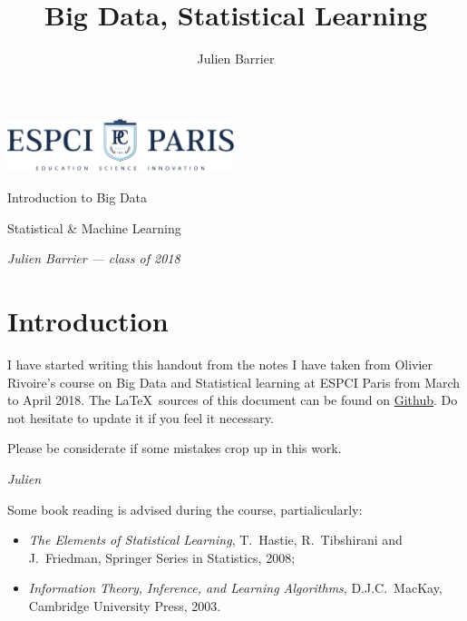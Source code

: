 \documentclass[a4paper]{tufte-book}
\title{Big Data, Statistical Learning}
\author{Julien Barrier}
\newcommand{\thetitle}{Introduction to Big Data}
\newcommand{\theauthor}{Julien Barrier --- class of 2018}
\newcommand{\pc}{ESPCI Paris}
\newcommand{\thesubtitle}{Statistical \& Machine Learning}
\begin{document}
\frontmatter

\thispagestyle{empty}
\begin{fullwidth}
    \setlength{\parindent}{0pt}
    \begin{center}
        \fontsize{24}{24}\selectfont\textit{
            \includegraphics*[width=2.6in]{ESPCI_baseline_couleur}
        }
    \end{center}
    \vspace{3in}\fontsize{36}{54}\selectfont\thetitle

    \vspace{0.125in}\fontsize{18}{18}\selectfont\thesubtitle

    \vfill\fontsize{14}{14}\selectfont\textit{\theauthor}
\end{fullwidth}

\newpage

\cleardoublepage
\chapter*{Introduction}

I have started writing this handout from the notes I have taken from
Olivier Rivoire's course on Big Data and Statistical learning at \pc{} from
March to April 2018. The \LaTeX ~sources of this document can be found on
\href{https://github.com/julienbarrier/bigdata-handout}{Github}. Do not hesitate
to update it if you feel it necessary.

Please be considerate if some mistakes crop up in this work.

\vspace{.5cm}
\emph{Julien}
\vspace{1cm}

Some book reading is advised during the course, partialicularly:

\begin{itemize}
    \item \emph{The Elements of Statistical Learning}, T.~Hastie, R.~Tibshirani and J.~Friedman, Springer Series in Statistics, 2008;
    \item \emph{Information Theory, Inference, and Learning Algorithms}, D.J.C.~MacKay, Cambridge University Press, 2003.
\end{itemize}

\vspace{1cm}
\end{document}
